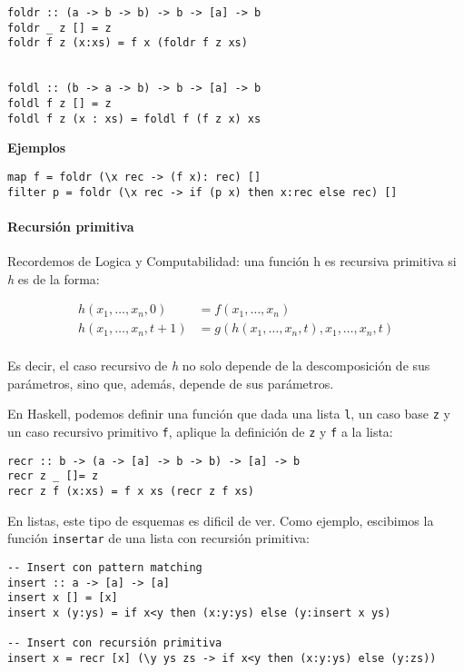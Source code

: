 \begin{centrado}
	\begin{verbatim}
foldr :: (a -> b -> b) -> b -> [a] -> b
foldr _ z [] = z
foldr f z (x:xs) = f x (foldr f z xs)
		
		
foldl :: (b -> a -> b) -> b -> [a] -> b
foldl f z [] = z
foldl f z (x : xs) = foldl f (f z x) xs
\end{verbatim}
\end{centrado}

\textbf{Ejemplos}

\begin{centrado}
	\begin{verbatim}
map f = foldr (\x rec -> (f x): rec) []
filter p = foldr (\x rec -> if (p x) then x:rec else rec) []
	\end{verbatim}
\end{centrado}


\paragraph{Recursión primitiva}
Recordemos de Logica y Computabilidad: una función h es recursiva primitiva si \textit{h} es de la forma:

\begin{align}
		h(x_1,\dots,x_n,0) &= f(x_1,\dots,x_n) \\
		h(x_1,\dots,x_n,t+1) &= g(h(x_1,\dots,x_n, t),x_1,\dots, x_n, t) \\
\end{align}

Es decir, el caso recursivo de \textit{h} no solo depende de la descomposición de sus parámetros, sino que, además, depende de sus parámetros.

En Haskell, podemos definir una función que dada una lista \texttt{l}, un caso base \texttt{z} y un caso recursivo primitivo \texttt{f}, aplique la definición de \texttt{z} y \texttt{f} a la lista:
\begin{centrado}
	\begin{verbatim}
recr :: b -> (a -> [a] -> b -> b) -> [a] -> b
recr z _ []= z
recr z f (x:xs) = f x xs (recr z f xs)
	\end{verbatim}
\end{centrado}

En listas, este tipo de esquemas es dificil de ver. Como ejemplo, escibimos la función \texttt{insertar} de una lista con recursión primitiva:
\begin{centrado}
	\begin{verbatim}
-- Insert con pattern matching
insert :: a -> [a] -> [a]
insert x [] = [x]
insert x (y:ys) = if x<y then (x:y:ys) else (y:insert x ys)

-- Insert con recursión primitiva
insert x = recr [x] (\y ys zs -> if x<y then (x:y:ys) else (y:zs))
	\end{verbatim}
\end{centrado}

